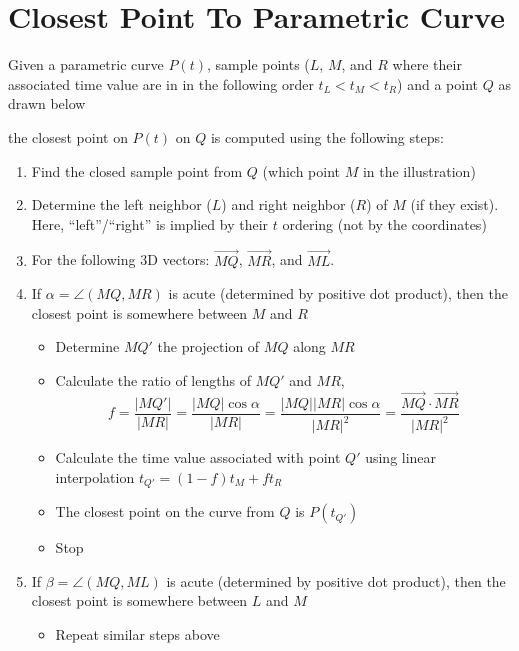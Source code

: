 \documentclass[]{article}
\begin{document}
\section*{Closest Point To Parametric Curve}
Given a parametric curve $P(t)$, sample points ($L$, $M$, and $R$ where their associated time value are in
in the following order $t_L < t_M < t_R$) and a point $Q$ as drawn below


the closest point on $P(t)$ on $Q$ is computed using the following steps:
\begin{enumerate}
  \item Find the closed sample point from $Q$ (which point $M$ in the illustration)
  \item Determine the left neighbor ($L$) and right neighbor ($R$) of $M$ (if they exist).
  Here, ``left''/``right'' is implied by their $t$ ordering (not by the coordinates)
  \item For the following 3D vectors: $\vec{MQ}$, $\vec{MR}$, and $\vec{ML}$.
  \item If $\alpha = \angle (MQ, MR)$ is acute (determined by positive dot product),
  then the closest point is somewhere between $M$ and $R$
  \begin{itemize}
    \item Determine $MQ'$ the projection of $MQ$ along $MR$
    \item Calculate the ratio of lengths of $MQ'$ and $MR$,
    $$f = \frac{|MQ'|}{|MR|}= \frac{|MQ| \cos\alpha}{|MR|} = \frac{|MQ||MR| \cos\alpha}{|MR|^2} = \frac{\vec{MQ}\cdot \vec{MR}}{|MR|^2}$$
    \item Calculate the time value associated with point $Q'$ using linear interpolation
    $t_{Q'} = (1-f)t_M + ft_R$
    \item The closest point on the curve from $Q$ is $P(t_{Q'})$
    \item Stop
  \end{itemize}
  \item If $\beta = \angle (MQ, ML)$ is acute (determined by positive dot product),
  then the closest point is somewhere between $L$ and $M$
  \begin{itemize}
    \item Repeat similar steps above
  \end{itemize}

\end{enumerate}
\end{document}
